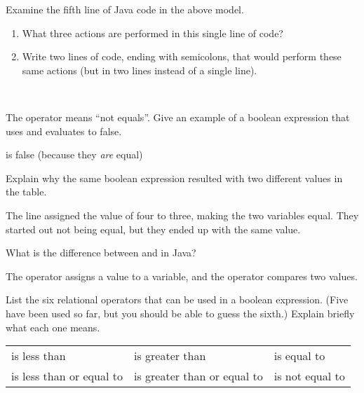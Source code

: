 \Q Examine the fifth line of Java code in the above model.

\begin{enumerate}

\item What three actions are performed in this single line of code?

\item Write two lines of code, ending with semicolons, that would perform these same actions (but in two lines instead of a single line).

 \\

\end{enumerate}


\Q The \java{!=} operator means ``not equals''.
Give an example of a boolean expression that uses \java{!=} and evaluates to false.

\begin{answer}[3em]
 is false (because they {\it are} equal)
\end{answer}


\Q Explain why the same boolean expression  resulted with two different values in the table.

\begin{answer}
The line  assigned the value of four to three, making the two variables equal.
They started out not being equal, but they ended up with the same value.
\end{answer}


\Q What is the difference between \java{=} and \java{==} in Java?

\begin{answer}
The \java{=} operator assigns a value to a variable, and the \java{==} operator compares two values.
\end{answer}


\Q List the six relational operators that can be used in a boolean expression.
(Five have been used so far, but you should be able to guess the sixth.)
Explain briefly what each one means.

\begin{answer}
\begin{tabular}{lll}
\java{<} is less than              & \java{>} is greater than              & \java{==} is equal to     \\
\java{<=} is less than or equal to & \java{>=} is greater than or equal to & \java{!=} is not equal to \\
\end{tabular}
\end{answer}
